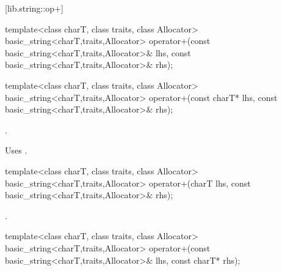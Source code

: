 [lib.string::op+]{}

%
%
\begin{itemdecl}
template<class charT, class traits, class Allocator>
  basic_string<charT,traits,Allocator>
    operator+(const basic_string<charT,traits,Allocator>& lhs,
              const basic_string<charT,traits,Allocator>& rhs);
\end{itemdecl}

\begin{itemdescr}
\pnum
\returns
{}
\end{itemdescr}

%
%
\begin{itemdecl}
template<class charT, class traits, class Allocator>
  basic_string<charT,traits,Allocator>
    operator+(const charT* lhs,
              const basic_string<charT,traits,Allocator>& rhs);
\end{itemdecl}

\begin{itemdescr}
\pnum
\returns
{}.

\pnum
\notes
Uses
.
\end{itemdescr}

%
%
\begin{itemdecl}
template<class charT, class traits, class Allocator>
  basic_string<charT,traits,Allocator>
    operator+(charT lhs,
              const basic_string<charT,traits,Allocator>& rhs);
\end{itemdecl}

\begin{itemdescr}
\pnum
\returns
{}.
\end{itemdescr}

%
%
\begin{itemdecl}
template<class charT, class traits, class Allocator>
  basic_string<charT,traits,Allocator>
    operator+(const basic_string<charT,traits,Allocator>& lhs,
              const charT* rhs);
\end{itemdecl}

